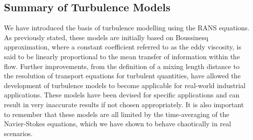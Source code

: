 \subsection{Summary of Turbulence Models}
We have introduced the basis of turbulence modelling using the RANS equations. As previously stated, these models are initially based on Boussinesq approximation, where a constant coefficient referred to as the eddy viscosity, is said to be linearly proportional to the mean transfer of information within the flow. Further improvements, from the definition of a mixing length distance to the resolution of transport equations for turbulent quantities, have allowed the development of turbulence models to become applicable for real-world industrial applications. These models have been devised for specific applications and can result in very inaccurate results if not chosen appropriately. It is also important to remember that these models are all limited by the time-averaging of the Navier-Stokes equations, which we have shown to behave chaotically in real scenarios. 

